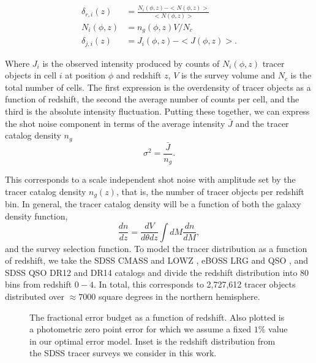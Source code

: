 \documentclass[fleqn,usenatbib]{mnras}
\begin{document}
\begin{eqnarray}
\label{overdensity}
\delta_{r,i}(z) &= \frac{N_i(\phi, z) - <N(\phi, z)>}{<N(\phi, z)>} \nonumber \\
N_i(\phi, z) &= n_g(\phi, z) V/N_c\, \\
\delta_{j,i}(z) &= J_i(\phi, z) - <J(\phi, z)>. \nonumber
\end{eqnarray}



Where $J_i$ is the observed intensity produced by counts of $N_i(\phi, z)$ tracer objects in cell $i$ at position $\phi$ and redshift $z$, $V$ is the survey volume and $N_c$ is the total number of cells. The first expression is the overdensity of tracer objects as a function of redshift, the second the average number of counts per cell, and the third is the absolute intensity fluctuation. Putting these together, we can express the shot noise component in terms of the average intensity $\bar{J}$ and the tracer catalog density $n_g$
\begin{equation}
\label{shot noise error} 
    \sigma^2 = \frac{\bar{J}}{n_g}.
\end{equation}


This corresponds to a scale independent shot noise with amplitude set by the tracer catalog density $n_g(z)$, that is, the number of tracer objects per redshift bin. In general, the tracer catalog density will be a function of both the galaxy density function, $$\frac{dn}{dz} = \frac{dV}{d\theta dz} \int dM \frac{dn}{dM},$$ and the survey selection function. To model the tracer distribution as a function of redshift, we take the SDSS CMASS and LOWZ \citep{Reid2016}, eBOSS LRG and QSO \citep{Ross2020}, and SDSS QSO DR12 \citep{Paris2017} and DR14 \citep{Paris2018} catalogs and divide the redshift distribution into $80$ bins from redshift $0-4$. In total, this corresponds to 2,727,612 tracer objects distributed over $\approx 7000$ square degrees in the northern hemisphere. 

\begin{figure}
\caption{\label{fig:Model1} The fractional error budget as a function of redshift. Also plotted is a photometric zero point error for which we assume a fixed $1\%$ value in our optimal error model. Inset is the redshift distribution from the SDSS tracer surveys we consider in this work.}
\end{figure}
\end{document}
